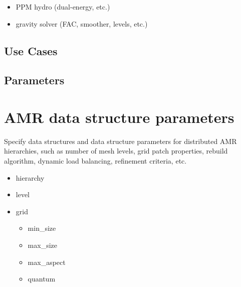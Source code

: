 \documentclass{book}
\begin{document}
\begin{itemize}
\item PPM hydro (dual-energy, etc.)
\item gravity solver (FAC, smoother, levels, etc.)
\end{itemize}

\subsection{Use Cases}
\subsection{Parameters}

\section{AMR data structure parameters} \label{s:amr}

Specify data structures and data structure parameters for distributed
AMR hierarchies, such as number of mesh levels, grid patch properties,
rebuild algorithm, dynamic load balancing, refinement criteria, etc.

\begin{itemize}
\item hierarchy
\item level
\item grid
\begin{itemize}
\item min\_size
\item max\_size
\item max\_aspect
\item quantum
\end{itemize}
\end{itemize}

\end{document}
